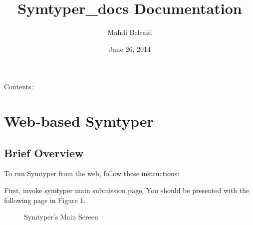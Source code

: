 \documentclass[letterpaper,10pt,english]{sphinxmanual}
\title{Symtyper\_docs Documentation}
\date{June 26, 2014}
\author{Mahdi Belcaid}
\begin{document}
\maketitle
\tableofcontents
{}\label{index::doc}


Contents:


\chapter{Web-based Symtyper}
\label{Web::doc}\label{Web:web-based-symtyper}\label{Web:welcome-to-symtyper-docs-s-documentation}

\section{Brief Overview}
\label{Web:brief-overview}
To run Symtyper from the web, follow these instructions:

First, invoke symtyper main submission page. You should be presented with the following page in Figure 1.
\begin{figure}[htbp]
\centering
\capstart

\caption{Symtyper's Main Screen}\end{figure}
\end{document}
